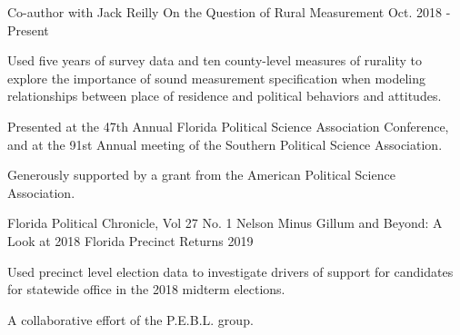 

\begin{cventries}

    \cventry
      {Co-author with Jack Reilly} %
      {On the Question of Rural Measurement} %
      {Oct. 2018 - Present} %
      {} %
      {
        \begin{cvitems} %
          \item {Used five years of survey data and ten county-level measures of rurality to explore the importance of sound measurement specification when modeling relationships between place of residence and political behaviors and attitudes.}
          \item {Presented at the 47th Annual Florida Political Science Association Conference, and at the 91st Annual meeting of the Southern Political Science Association.}
          \item {Generously supported by a grant from the American Political Science Association.}
        \end{cvitems}
      }

    \cventry
      {Florida Political Chronicle, Vol 27 No. 1} %
      {Nelson Minus Gillum and Beyond: A Look at 2018 Florida Precinct Returns} %
      {2019} %
      {} %
      {
        \begin{cvitems} %
          \item {Used precinct level election data to investigate drivers of support for candidates for statewide office in the 2018 midterm elections.}
          \item {A collaborative effort of the P.E.B.L. group.}
        \end{cvitems}
      }


\end{cventries}
